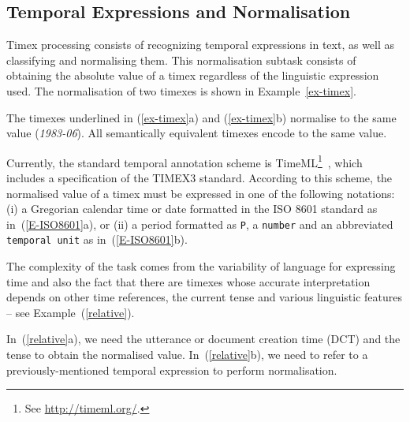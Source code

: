\documentclass[10pt, a4paper]{article}
\begin{document}
\subsection{Temporal Expressions and Normalisation}
Timex processing consists of recognizing temporal expressions in text, as well as classifying and normalising them.
This normalisation subtask consists of obtaining the absolute value of a timex regardless of the linguistic expression used. The normalisation of two timexes is shown in Example~\ref{ex-timex}.

\small
{}\label{ex-timex}
\normalsize

The timexes underlined in (\ref{ex-timex}a) and (\ref{ex-timex}b) normalise to the same value (\textit{1983-06}). 
All semantically equivalent timexes encode to the same value.


Currently, the standard temporal annotation scheme is TimeML\footnote{See \url{http://timeml.org/}.}~\cite{Pustejovsky2003TimeML}, which includes a specification of the TIMEX3 standard.
According to this scheme, the normalised value of a timex must be expressed in one of the following notations: (i) a Gregorian calendar time or date formatted in the ISO 8601 standard as in~(\ref{E-ISO8601}a), or (ii) a period formatted as \texttt{P}, a \texttt{number} and an abbreviated \texttt{temporal unit} as in~(\ref{E-ISO8601}b). 

\small
{}\label{E-ISO8601}
\normalsize

The complexity of the task comes from the variability of language for expressing time and also the fact that there are timexes whose accurate interpretation depends on other time references, the current tense and various linguistic features -- see Example~(\ref{relative}).

\small
{}\label{relative}
\normalsize

In~(\ref{relative}a), we need the utterance or document creation time (DCT) and the tense to obtain the normalised value. In~(\ref{relative}b), we need to refer to a previously-mentioned temporal expression to perform normalisation.
\end{document}
